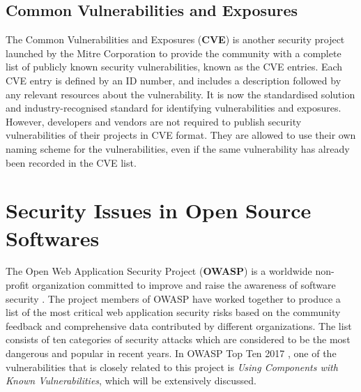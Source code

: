 \documentclass[12pt, a4paper]{report}
\begin{document}
\subsection{Common Vulnerabilities and Exposures}
The Common Vulnerabilities and Exposures (\textbf{CVE}) is another security project launched by the
Mitre Corporation \cite{cve} to provide the community with a complete list of publicly known
security vulnerabilities, known as the CVE entries. Each CVE entry is defined by an ID number, and
includes a description followed by any relevant resources about the vulnerability. It is now the
standardised solution and industry-recognised standard for identifying vulnerabilities and
exposures. However, developers and vendors are not required to publish security vulnerabilities of
their projects in CVE format. They are allowed to use their own naming scheme for the
vulnerabilities, even if the same vulnerability has already been recorded in the CVE list.

\section{Security Issues in Open Source Softwares}
The Open Web Application Security Project (\textbf{OWASP}) is a worldwide non-profit organization
committed to improve and raise the awareness of software security \cite{owasp_home}. The project
members of OWASP have worked together to produce a list of the most critical web application
security risks based on the community feedback and comprehensive data contributed by different
organizations. The list consists of ten categories of security attacks which are considered to be
the most dangerous and popular in recent years. In OWASP Top Ten 2017 \cite{owasp_top10}, one of the
vulnerabilities that is closely related to this project is \textit{Using Components with Known
Vulnerabilities}, which will be extensively discussed.
\end{document}
